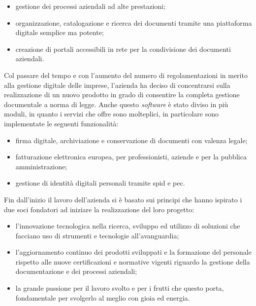 \begin{itemize}
	\item gestione dei processi aziendali ad alte prestazioni;
	\item organizzazione, catalogazione e ricerca dei documenti tramite una piattaforma digitale semplice ma potente;
	\item creazione di portali accessibili in rete per la condivisione dei documenti aziendali.
\end{itemize}

Col passare del tempo e con l'aumento del numero di regolamentazioni in merito alla gestione digitale delle imprese, l'azienda ha deciso di concentrarsi sulla realizzazione di un nuovo prodotto in grado di consentire la completa gestione documentale a norma di legge. Anche questo \textit{software} è stato diviso in più moduli, in quanto i servizi che offre sono molteplici, in particolare sono implementate le seguenti funzionalità:

\begin{itemize}
	\item firma digitale, archiviazione e conservazione di documenti con valenza legale;
	\item fatturazione elettronica europea, per professionisti, aziende e per la pubblica amministrazione;
	\item gestione di identità digitali personali tramite \gls{spid}\glsfirstoccur{} e \gls{pec}\glsfirstoccur.
\end{itemize}

Fin dall'inizio il lavoro dell'azienda si è basato sui principi che hanno ispirato i due soci fondatori ad iniziare la realizzazione del loro progetto:

\begin{itemize}
	\item l'innovazione tecnologica nella ricerca, sviluppo ed utilizzo di soluzioni che facciano uso di strumenti e tecnologie all'avanguardia;
	\item l'aggiornamento continuo dei prodotti sviluppati e la formazione del personale rispetto alle nuove certificazioni e normative vigenti riguardo la gestione della documentazione e dei processi aziendali;
	\item la grande passione per il lavoro svolto e per i frutti che questo porta, fondamentale per svolgerlo al meglio con gioia ed energia.
\end{itemize}

